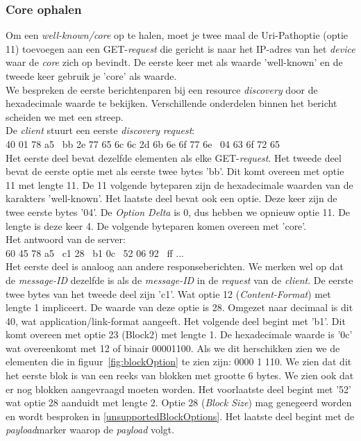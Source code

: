\subsubsection{Core ophalen}
Om een \textit{well-known/core} op te halen, moet je twee maal de Uri-Pathoptie (optie 11) toevoegen aan een GET-\textit{request} die gericht is naar het IP-adres van het \textit{device} waar de \textit{core} zich op bevindt. De eerste keer met als waarde 'well-known' en de tweede keer gebruik je 'core' als waarde.\\

\noindent
We bespreken de eerste berichtenparen bij een resource \textit{discovery} door de hexadecimale waarde te bekijken. Verschillende onderdelen binnen het bericht scheiden we met een streep.\\

\noindent
De \textit{client} stuurt een eerste \textit{discovery} \textit{request}:\\
40 01 78 a5 \textbar~bb 2e 77 65 6c 6c 2d 6b 6e 6f 77 6e \textbar~04 63 6f 72 65\\
Het eerste deel bevat dezelfde elementen als elke GET-\textit{request}. Het tweede deel bevat de eerste optie met als eerste twee bytes 'bb'. Dit komt overeen met optie 11 met lengte 11. De 11 volgende byteparen zijn de hexadecimale waarden van de karakters 'well-known'. Het laatste deel bevat ook een optie. Deze keer zijn de twee eerste bytes '04'. De \textit{Option Delta} is 0, dus hebben we opnieuw optie 11. De lengte is deze keer 4. De volgende byteparen komen overeen met 'core'.\\

\noindent
Het antwoord van de server:\\
60 45 78 a5 \textbar~c1 28 \textbar~b1 0c \textbar~52 06 92 \textbar~ff ...\\
Het eerste deel is analoog aan andere responseberichten. We merken wel op dat de \textit{message-ID} dezelfde is als de \textit{message-ID} in de \textit{request} van de \textit{client}. De eerste twee bytes van het tweede deel zijn 'c1'. Wat optie 12 (\textit{Content-Format}) met lengte 1 impliceert. De waarde van deze optie is 28. Omgezet naar decimaal is dit 40, wat application/link-format aangeeft. Het volgende deel begint met 'b1'. Dit komt overeen met optie 23 (Block2) met lengte 1. De hexadecimale waarde is '0c' wat overeenkomt met 12 of binair 00001100. Als we dit herschikken zien we de elementen die in figuur~\ref{fig:blockOption} te zien zijn: 0000 1 110. We zien dat dit het eerste blok is van een reeks van blokken met grootte 6 bytes. We zien ook dat er nog blokken aangevraagd moeten worden. Het voorlaatste deel begint met '52' wat optie 28 aanduidt met lengte 2. Optie 28 (\textit{Block Size}) mag genegeerd worden en wordt besproken in \ref{unsupportedBlockOptions}. Het laatste deel begint met de \textit{payload}marker waarop de \textit{payload} volgt.\\

